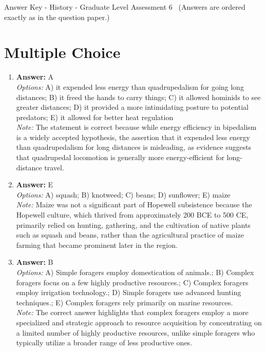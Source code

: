 \documentclass[12pt]{article}
\begin{document}
\begin{center}
Answer Key - History - Graduate Level Assessment 6 \
\small (Answers are ordered exactly as in the question paper.)
\end{center}

\section*{Multiple Choice}
\begin{enumerate}[label=\arabic*.]
\item \textbf{Answer:} A
\\ \textit{Options:} A) it expended less energy than quadrupedalism for going long distances; B) it freed the hands to carry things; C) it allowed hominids to see greater distances; D) it provided a more intimidating posture to potential predators; E) it allowed for better heat regulation
\\ \textit{Note:} The statement is correct because while energy efficiency in bipedalism is a widely accepted hypothesis, the assertion that it expended less energy than quadrupedalism for long distances is misleading, as evidence suggests that quadrupedal locomotion is generally more energy-efficient for long-distance travel.
\item \textbf{Answer:} E
\\ \textit{Options:} A) squash; B) knotweed; C) beans; D) sunflower; E) maize
\\ \textit{Note:} Maize was not a significant part of Hopewell subsistence because the Hopewell culture, which thrived from approximately 200 BCE to 500 CE, primarily relied on hunting, gathering, and the cultivation of native plants such as squash and beans, rather than the agricultural practice of maize farming that became prominent later in the region.
\item \textbf{Answer:} B
\\ \textit{Options:} A) Simple foragers employ domestication of animals.; B) Complex foragers focus on a few highly productive resources.; C) Complex foragers employ irrigation technology.; D) Simple foragers use advanced hunting techniques.; E) Complex foragers rely primarily on marine resources.
\\ \textit{Note:} The correct answer highlights that complex foragers employ a more specialized and strategic approach to resource acquisition by concentrating on a limited number of highly productive resources, unlike simple foragers who typically utilize a broader range of less productive ones.

\end{enumerate}
\end{document}
